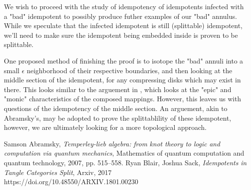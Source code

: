 \documentclass[11pt]{article}
\begin{document}
We wish to proceed with the study of idempotency of idempotents infected with a "bad" idempotent to possibly produce futher examples of our "bad" annulus. While we speculate that the infected idempotent is still (splittable) idempotent, we'll need to make sure the idempotent being embedded inside is proven to be splittable. 

One proposed method of finishing the proof is to isotope the "bad" annuli into a small $\epsilon$ neighborhood of their respective boundaries, and then looking at the middle section of the idempotent, for any compressing disks which may exist in there. This looks similar to the arguement in \cite{Abramsky}, which looks at the "epic" and "monic" characteristics of the composed mappings. However, this leaves us with questions of the idempotency of the middle section. An arguement, akin to Abramsky's, may be adopted to prove the splittablility of these idempotent, however, we are ultimately looking for a more topological approach. 





\begin{thebibliography}{2}
 Samson Abramsky, \emph{Temperley-lieb algebra: from knot theory to logic and computation via quantum mechanics}, Mathematics of quantum computation and
quantum technology, 2007, pp. 515–558.
 Ryan Blair, Joshua Sack, \emph{Idempotents in Tangle Categories Split}, Arxiv, 2017 \\https://doi.org/10.48550/ARXIV.1801.00230
\end{thebibliography}
\end{document}
